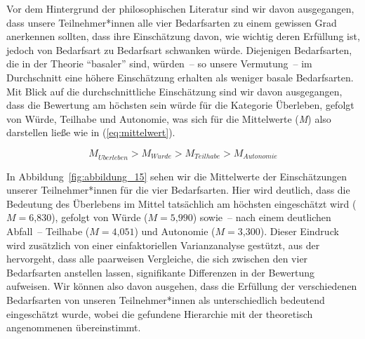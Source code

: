 \documentclass[justified,nobib,symmetric,twoside]{tufte-handout}
\begin{document}
Vor dem Hintergrund der philosophischen Literatur sind wir davon ausgegangen, dass unsere Teilnehmer*innen alle vier Bedarfsarten zu einem gewissen Grad anerkennen sollten, dass ihre Einschätzung davon, wie wichtig deren Erfüllung ist, jedoch von Bedarfsart zu Bedarfsart schwanken würde.
Diejenigen Bedarfsarten, die in der Theorie \enquote{basaler} sind, würden~-- so unsere Vermutung~-- im Durchschnitt eine höhere Einschätzung erhalten als weniger basale Bedarfsarten.
Mit Blick auf die durchschnittliche Einschätzung sind wir davon ausgegangen, dass die Bewertung am höchsten sein würde für die Kategorie Überleben, gefolgt von Würde, Teilhabe und Autonomie, was sich für die Mittelwerte (\textit{M}) also darstellen ließe wie in (\ref{eq:mittelwert}).

\begin{equation}\label{eq:mittelwert}
   M_{\ddot{U}berleben}>M_{W\ddot{u}rde}>M_{Teilhabe}>M_{Autonomie}
\end{equation}

In Abbildung~\ref{fig:abbildung_15} sehen wir die Mittelwerte der Einschätzungen unserer Teilnehmer*innen für die vier Bedarfsarten.
Hier wird deutlich, dass die Bedeutung des Überlebens im Mittel tatsächlich am höchsten eingeschätzt wird ($M = \textrm{6,830}$), gefolgt von Würde ($M = \textrm{5,990}$) sowie~-- nach einem deutlichen Abfall~-- Teilhabe ($M = \textrm{4,051}$) und Autonomie ($M = \textrm{3,300}$).
Dieser Eindruck wird zusätzlich von einer einfaktoriellen Varianzanalyse gestützt, aus der hervorgeht, dass alle paarweisen Vergleiche, die sich zwischen den vier Bedarfsarten anstellen lassen, signifikante Differenzen in der Bewertung aufweisen.
Wir können also davon ausgehen, dass die Erfüllung der verschiedenen Bedarfsarten von unseren Teilnehmer*innen als unterschiedlich bedeutend eingeschätzt wurde, wobei die gefundene Hierarchie mit der theoretisch angenommenen übereinstimmt.


\end{document}
